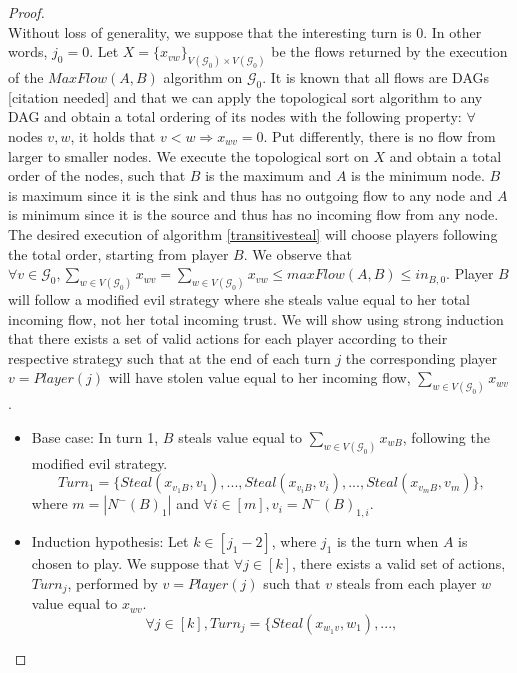\documentclass[11pt]{article}
\theoremstyle{definition}
\theoremstyle{corollary}
\theoremstyle{lemma}
\begin{document}
    \begin{proof} \ \\
       Without loss of generality, we suppose that the interesting turn is 0. In other words, $j_0 = 0$. Let $X =
       \{x_{vw}\}_{V(\mathcal{G}_0) \times V(\mathcal{G}_0)}$ be the flows returned by the execution of the $MaxFlow(A, B)$
       algorithm on $\mathcal{G}_0$. It is known that all flows are DAGs [citation needed] and that we can apply the
       topological sort algorithm to any DAG and obtain a total ordering of its nodes with the following property: $\forall$
       nodes $v, w$, it holds that $v < w \Rightarrow x_{wv} = 0$. Put differently, there is no flow from larger to smaller
       nodes. We execute the topological sort on $X$ and obtain a total order of the nodes, such that $B$ is the maximum and
       $A$ is the minimum node. $B$ is maximum since it is the sink and thus has no outgoing flow to any node and $A$ is
       minimum since it is the source and thus has no incoming flow from any node. The desired execution of algorithm
       \ref{transitivesteal} will choose players following the total order, starting from player $B$. We observe that
       $\forall v \in \mathcal{G}_0, \sum\limits_{w \in V(\mathcal{G}_0)}x_{wv} = \sum\limits_{w \in V(\mathcal{G}_0)}x_{vw}
       \leq maxFlow(A, B) \leq in_{B, 0}$. Player $B$ will follow a modified evil strategy where she steals value equal to
       her total incoming flow, not her total incoming trust. We will show using strong induction that there exists a set of
       valid actions for each player according to their respective strategy such that at the end of each turn $j$ the
       corresponding player $v = Player(j)$ will have stolen value equal to her incoming flow,
       $\sum\limits_{w \in V(\mathcal{G}_0)}x_{wv}$.
       \begin{itemize}
          \item Base case: In turn 1, $B$ steals value equal to $\sum\limits_{w \in V(\mathcal{G}_0)}x_{wB}$, following the
          modified evil strategy. $$Turn_1 = \{Steal(x_{v_1B}, v_1), ..., Steal(x_{v_iB}, v_i), ...,Steal(x_{v_mB},
          v_m)\},$$ where $m = |N^{-}(B)_1|$ and $\forall i \in [m], v_i = N^{-}(B)_{1, i}$.
          \item Induction hypothesis: Let $k \in [j_1 - 2]$, where $j_1$ is the turn when $A$ is chosen to play. We suppose
          that $\forall j \in [k]$, there exists a valid set of actions, $Turn_j$, performed by $v = Player(j)$ such that $v$
          steals from each player $w$ value equal to $x_{wv}$. $$\forall j \in [k], Turn_j = \{Steal(x_{w_1v}, w_1), ...,
$$
\end{itemize}
\end{proof}
\end{document}
